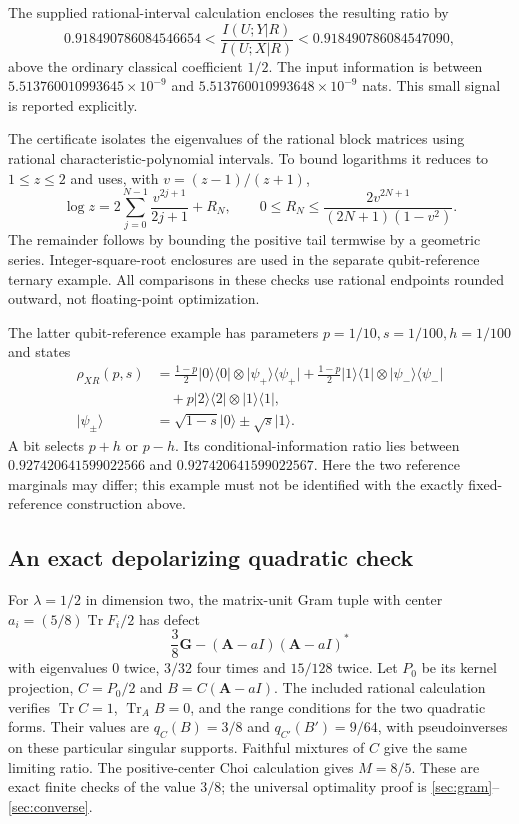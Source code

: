 \documentclass[11pt]{article}
\numberwithin{equation}{section}
\theoremstyle{definition}
\theoremstyle{remark}
\DeclareMathOperator{\Tr}{Tr}
\newcommand{\ket}[1]{\lvert #1\rangle}
\newcommand{\bra}[1]{\langle #1\rvert}
\begin{document}
The supplied rational-interval calculation encloses the resulting ratio by
\[
 0.918490786084546654
 <\frac{I(U;Y|R)}{I(U;X|R)}
 <0.918490786084547090,
\]
above the ordinary classical coefficient $1/2$.
The input information is between
$5.513760010993645\times10^{-9}$ and
$5.513760010993648\times10^{-9}$ nats.
This small signal is reported explicitly.

The certificate isolates the eigenvalues of the rational block matrices
using rational characteristic-polynomial intervals. To bound logarithms it
reduces to $1\leq z\leq2$ and uses, with $v=(z-1)/(z+1)$,
\[
 \log z=2\sum_{j=0}^{N-1}\frac{v^{2j+1}}{2j+1}+R_N,\qquad
 0\leq R_N\leq
 \frac{2v^{2N+1}}{(2N+1)(1-v^2)}.
\]
The remainder follows by bounding the positive tail termwise by a
geometric series. Integer-square-root enclosures are used in the
separate qubit-reference ternary example. All comparisons in these
checks use rational endpoints rounded outward, not floating-point
optimization.

The latter qubit-reference example has parameters
$p=1/10,s=1/100,h=1/100$ and states
\begin{align*}
 \rho_{XR}(p,s)
 &=\frac{1-p}{2}\ket0\bra0\otimes\ket{\psi_+}\bra{\psi_+}
 +\frac{1-p}{2}\ket1\bra1\otimes\ket{\psi_-}\bra{\psi_-}\\
 &\quad+p\ket2\bra2\otimes\ket1\bra1,\\
 \ket{\psi_\pm}&=\sqrt{1-s}\ket0\pm\sqrt s\ket1.
\end{align*}
A bit selects $p+h$ or $p-h$. Its conditional-information ratio lies
between $0.927420641599022566$ and $0.927420641599022567$.
Here the two reference marginals may differ; this example must not be
identified with the exactly fixed-reference construction above.

\subsection{An exact depolarizing quadratic check}

For $\lambda=1/2$ in dimension two, the matrix-unit Gram tuple with
center $a_i=(5/8)\Tr F_i/2$ has defect
\[
 \frac38\mathbf G-(\mathbf A-aI)(\mathbf A-aI)^*
\]
with eigenvalues $0$ twice, $3/32$ four times and $15/128$ twice.
Let $P_0$ be its kernel projection, $C=P_0/2$ and
$B=C(\mathbf A-aI)$. The included rational calculation verifies
$\Tr C=1$, $\Tr_A B=0$, and the range conditions for the two
quadratic forms. Their values are $q_C(B)=3/8$ and
$q_{C'}(B')=9/64$, with pseudoinverses on these particular singular
supports. Faithful mixtures of $C$ give the same limiting ratio.
The positive-center Choi calculation gives $M=8/5$.
These are exact finite checks of the value $3/8$; the universal
optimality proof is \cref{sec:gram}--\cref{sec:converse}.
\end{document}
